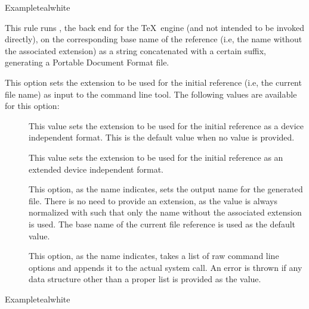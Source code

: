 \begin{description}
\begin{codebox}{Example}{teal}{\icnote}{white}
\end{codebox}

\item[\rulebox{xdvipdfmx}]
This rule runs , the back end for the  \TeX\ engine (and not intended to be invoked directly), on the corresponding base name of the  reference (i.e, the name without the associated extension) as a string concatenated with a certain suffix, generating a Portable Document Format  file.

\item[\abox{entry}] This option sets the extension to be used for the initial reference (i.e, the current file name) as input to the command line tool. The following values are available for this option:

\begin{description}
\item[] This value sets the extension to be used for the initial reference as a device independent format. This is the default value when no value is provided.

\item[] This value sets the extension to be used for the initial reference as an extended device independent format.
\end{description}

\begin{description}
\item[] This option, as the name indicates, sets the output name for the generated  file. There is no need to provide an extension, as the value is always normalized with  such that only the name without the associated extension is used. The base name of the current file reference is used as the default value.

\item[] This option, as the name indicates, takes a list of raw command line options and appends it to the actual system call. An error is thrown if any data structure other than a proper list is provided as the value.
\end{description}

\begin{codebox}{Example}{teal}{\icnote}{white}
\end{codebox}


\end{description}
